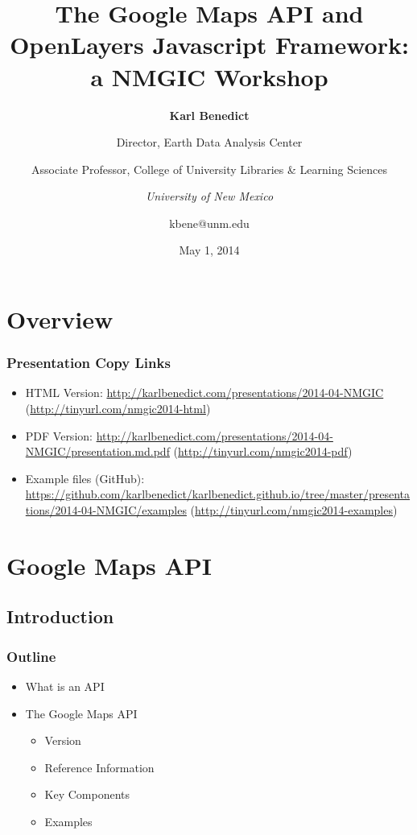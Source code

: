 \documentclass[]{article}
\title{The Google Maps API and OpenLayers Javascript Framework: a NMGIC
Workshop}
\author{\textbf{Karl Benedict} \and Director, Earth Data Analysis Center \and Associate Professor, College of University Libraries \& Learning
Sciences \and \emph{University of New Mexico} \and kbene@unm.edu}
\date{May 1, 2014}
\begin{document}
\maketitle

{
\hypersetup{linkcolor=black}
\setcounter{tocdepth}{3}
\tableofcontents
}
\section{Overview}\label{overview}

\subsubsection{Presentation Copy Links}\label{presentation-copy-links}

\begin{itemize}
\itemsep1pt\parskip0pt
\item
  HTML Version:
  \url{http://karlbenedict.com/presentations/2014-04-NMGIC}
  (\url{http://tinyurl.com/nmgic2014-html})
\item
  PDF Version:
  \url{http://karlbenedict.com/presentations/2014-04-NMGIC/presentation.md.pdf}
  (\url{http://tinyurl.com/nmgic2014-pdf})
\item
  Example files (GitHub):
  \url{https://github.com/karlbenedict/karlbenedict.github.io/tree/master/presentations/2014-04-NMGIC/examples}
  (\url{http://tinyurl.com/nmgic2014-examples})
\end{itemize}

\section{Google Maps API}\label{google-maps-api}

\subsection{Introduction}\label{introduction}

\subsubsection{Outline}\label{outline}

\begin{itemize}
\itemsep1pt\parskip0pt
\item
  What is an API
\item
  The Google Maps API

  \begin{itemize}
  \itemsep1pt\parskip0pt
  \item
    Version
  \item
    Reference Information
  \item
    Key Components
  \item
    Examples
  \end{itemize}
\end{itemize}
\end{document}
